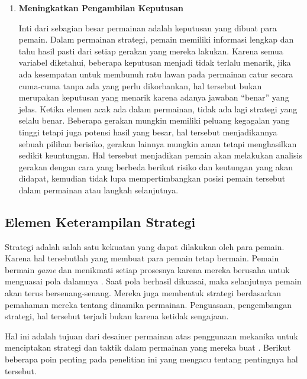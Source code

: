 \begin{enumerate}[label=\textbf{\alph*).}]
	\item \textbf{Meningkatkan Pengambilan Keputusan}
	
	Inti dari sebagian besar permainan adalah keputusan yang dibuat para pemain. Dalam permainan strategi, pemain memiliki informasi lengkap dan tahu hasil pasti dari setiap gerakan yang mereka lakukan. Karena semua variabel diketahui, beberapa keputusan menjadi tidak terlalu menarik, jika ada kesempatan untuk membunuh ratu lawan pada permainan catur secara cuma-cuma tanpa ada yang perlu dikorbankan, hal tersebut bukan merupakan keputusan yang menarik karena adanya jawaban ``benar'' yang jelas. Ketika elemen acak ada dalam permainan, tidak ada lagi strategi yang selalu benar. Beberapa gerakan mungkin memiliki peluang kegagalan yang tinggi tetapi juga potensi hasil yang besar, hal tersebut menjadikannya sebuah pilihan berisiko, gerakan lainnya mungkin aman tetapi menghasilkan sedikit keuntungan. Hal tersebut menjadikan pemain akan melakukan analisis gerakan dengan cara yang berbeda berikut risiko dan keutungan yang akan didapat, kemudian tidak lupa mempertimbangkan posisi pemain tersebut dalam permainan atau langkah selanjutnya.
\end{enumerate}

\subsection{Elemen Keterampilan Strategi}
\label{sec:sub_sec2_strategi}
\vspace{1ex}

Strategi adalah salah satu kekuatan yang dapat dilakukan oleh para pemain. Karena hal tersebutlah yang membuat para pemain tetap bermain. Pemain bermain \textit{game} dan menikmati setiap prosesnya karena mereka berusaha untuk menguasai pola dalamnya \citep{Koster2013}. Saat pola berhasil dikuasai, maka selanjutnya pemain akan terus bersenang-senang. Mereka juga membentuk strategi berdasarkan pemahaman mereka tentang dinamika permainan. Penguasaan, pengembangan strategi, hal tersebut terjadi bukan karena ketidak sengajaan. 
\vspace{1ex}

Hal ini adalah tujuan dari desainer permainan atas penggunaan mekanika untuk menciptakan strategi dan taktik dalam permainan yang mereka buat \citep{Brathwaite2009}. Berikut beberapa poin penting pada penelitian ini yang mengacu tentang pentingnya hal tersebut.

